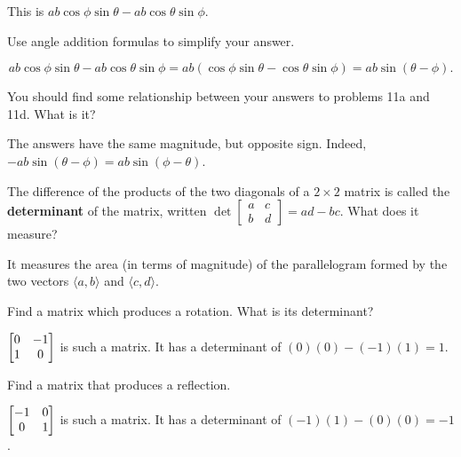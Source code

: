 \documentclass[../gatm_answers.tex]{subfiles}
\begin{document}
This is $ab\cos\phi\sin\theta - ab\cos\theta\sin\phi$.

\begin{inner_problem}
\item Use angle addition formulas to simplify your answer.
\end{inner_problem}

$$ab\cos\phi\sin\theta - ab\cos\theta\sin\phi = ab(\cos\phi\sin\theta - \cos\theta\sin\phi) = ab\sin(\theta-\phi).$$

\begin{inner_problem}
\item You should find some relationship between your answers to problems 11a and 11d. What is it?
\end{inner_problem}

The answers have the same magnitude, but opposite sign. Indeed, $-ab\sin(\theta-\phi) = ab\sin(\phi-\theta)$.

\begin{inner_problem}
\item The difference of the products of the two diagonals of a $2\times 2$ matrix is called the \textbf{determinant} of the matrix, written $\det \left[\begin{smallmatrix}a & c \\ b & d \end{smallmatrix}\right]=ad-bc$. What does it measure?
\end{inner_problem}

It measures the area (in terms of magnitude) of the parallelogram formed by the two vectors $\langle a,b\rangle$ and $\langle c,d\rangle$.

\begin{inner_problem}
\item Find a matrix which produces a rotation. What is its determinant?
\end{inner_problem}

$\begin{bmatrix} 0 & -1 \\ 1 & 0 \end{bmatrix}$ is such a matrix. It has a determinant of $(0)(0)-(-1)(1)=1$.

\begin{inner_problem}
\item Find a matrix that produces a reflection.
\end{inner_problem}

$\begin{bmatrix} -1 & 0 \\ 0 & 1 \end{bmatrix}$ is such a matrix. It has a determinant of $(-1)(1)-(0)(0)=-1$.
\end{document}
